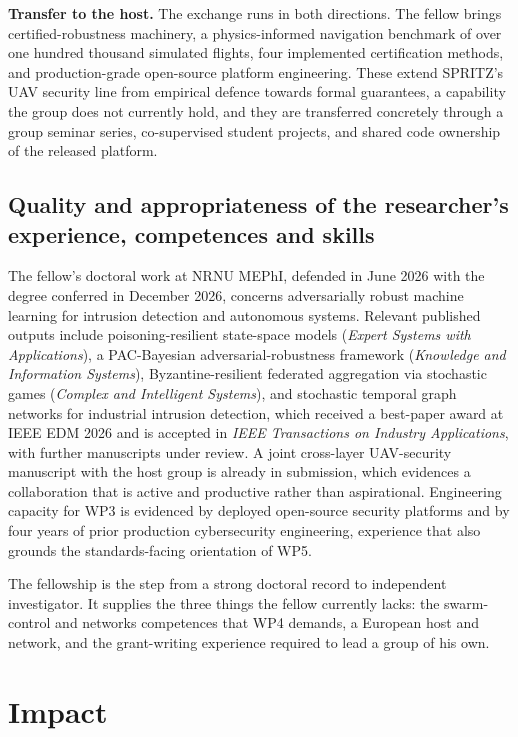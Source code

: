 \documentclass[11pt,a4paper]{article}
\begin{document}
\textbf{Transfer to the host.} The exchange runs in both directions. The fellow brings certified-robustness machinery, a physics-informed navigation benchmark of over one hundred thousand simulated flights, four implemented certification methods, and production-grade open-source platform engineering. These extend SPRITZ's UAV security line from empirical defence towards formal guarantees, a capability the group does not currently hold, and they are transferred concretely through a group seminar series, co-supervised student projects, and shared code ownership of the released platform.

\subsection{Quality and appropriateness of the researcher's experience, competences and skills}
The fellow's doctoral work at NRNU MEPhI, defended in June 2026 with the degree conferred in December 2026, concerns adversarially robust machine learning for intrusion detection and autonomous systems. Relevant published outputs include poisoning-resilient state-space models (\emph{Expert Systems with Applications}), a PAC-Bayesian adversarial-robustness framework (\emph{Knowledge and Information Systems}), Byzantine-resilient federated aggregation via stochastic games (\emph{Complex and Intelligent Systems}), and stochastic temporal graph networks for industrial intrusion detection, which received a best-paper award at IEEE EDM 2026 and is accepted in \emph{IEEE Transactions on Industry Applications}, with further manuscripts under review. A joint cross-layer UAV-security manuscript with the host group is already in submission, which evidences a collaboration that is active and productive rather than aspirational. Engineering capacity for WP3 is evidenced by deployed open-source security platforms and by four years of prior production cybersecurity engineering, experience that also grounds the standards-facing orientation of WP5.

The fellowship is the step from a strong doctoral record to independent investigator. It supplies the three things the fellow currently lacks: the swarm-control and networks competences that WP4 demands, a European host and network, and the grant-writing experience required to lead a group of his own.

\section{Impact}
\end{document}
